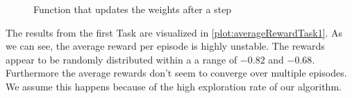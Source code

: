\documentclass{article}
\begin{document}
	
	
	
	
	\begin{figure}[h]
		\caption{Function that updates the weights after a step}
		\label{code:updateWeights}
		
	\end{figure}
	
	
	\noindent The results from the first Task are visualized in \autoref{plot:averageRewardTask1}. As we can see, the average reward per episode is highly unstable. The rewards appear to be randomly distributed within a a range of $-0.82$ and $-0.68$. Furthermore the average rewards don't seem to converge over multiple episodes. We assume this happens because of the high exploration rate of our algorithm.
	
\end{document}
